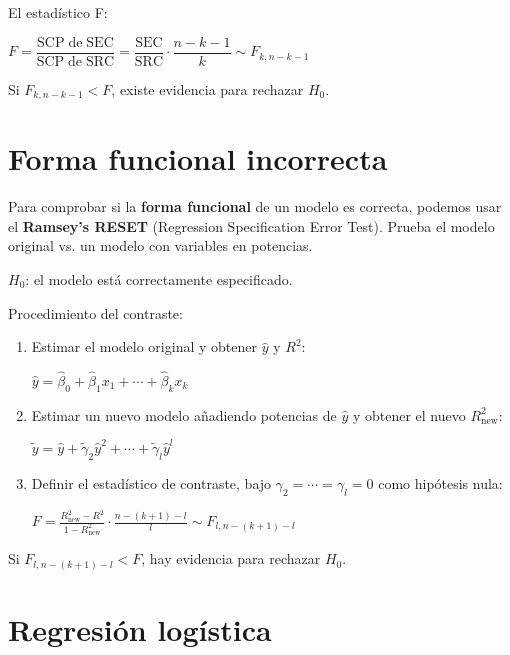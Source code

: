 \documentclass[10pt, a4paper, landscape]{extarticle}
\newcommand{\SSR}{\mathrm{SRC}}
\newcommand{\SSE}{\mathrm{SEC}}
\begin{document}
\begin{multicols}{3}
El estadístico F:

\begin{center}
	$F = \dfrac{\mathrm{SCP \; de \;} \SSE}{\mathrm{SCP \; de \;} \SSR} = \dfrac{\SSE}{\SSR} \cdot \dfrac{n - k - 1}{k} \sim F_{k, n - k - 1}$
\end{center}

Si $F_{k, n - k - 1} < F$, existe evidencia para rechazar $H_0$.

\columnbreak

\section*{Forma funcional incorrecta}

Para comprobar si la \textbf{forma funcional} de un modelo es correcta, podemos usar el \textbf{Ramsey's RESET} (Regression Specification Error Test). Prueba el modelo original vs. un modelo con variables en potencias.

\begin{center}
	$H_0$: el modelo está correctamente especificado.
\end{center}

Procedimiento del contraste:

\begin{enumerate}[leftmargin=*]
	\item Estimar el modelo original y obtener $\hat{y}$ y $R^2$:
	\begin{center}
		$\hat{y} = \hat{\beta}_0 + \hat{\beta}_1 x_1 + \cdots + \hat{\beta}_k x_k$
	\end{center}
	\item Estimar un nuevo modelo añadiendo potencias de $\hat{y}$ y obtener el nuevo $R^2_{\mathrm{new}}$:
	\begin{center}
		$\tilde{y} = \hat{y} + \tilde{\gamma}_2 \hat{y}^2 + \cdots + \tilde{\gamma}_l \hat{y}^l$
	\end{center}
	\item Definir el estadístico de contraste, bajo $\gamma_2 = \cdots = \gamma_l = 0$ como hipótesis nula:
	\begin{center}
		$F = \frac{R^2_{\mathrm{new}} - R^2}{1 - R^2_{\mathrm{new}}} \cdot \frac{n - (k + 1) - l}{l} \sim F_{l, n - (k + 1) - l}$
	\end{center}
\end{enumerate}

Si $F_{l, n - (k + 1) - l} < F$, hay evidencia para rechazar $H_0$.

\section*{Regresión logística}


\end{multicols}
\end{document}
